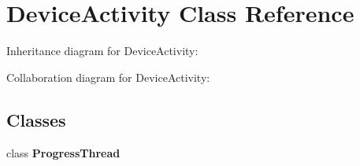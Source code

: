 \hypertarget{classcom_1_1axcoto_1_1shinjuku_1_1sushi_1_1_device_activity}{\section{\-Device\-Activity \-Class \-Reference}
\label{classcom_1_1axcoto_1_1shinjuku_1_1sushi_1_1_device_activity}
}


\-Inheritance diagram for \-Device\-Activity\-:


\-Collaboration diagram for \-Device\-Activity\-:
\subsection*{\-Classes}
\begin{DoxyCompactItemize}
\item 
class {\bfseries \-Progress\-Thread}
\end{DoxyCompactItemize}
